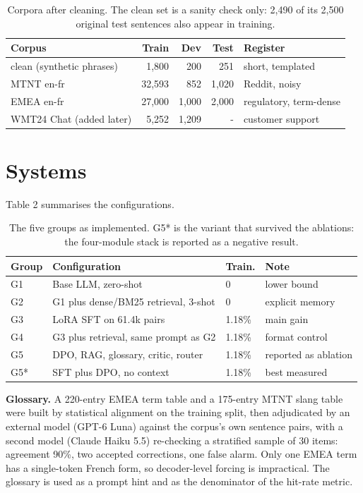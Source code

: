 \documentclass[a4paper,12pt,oneside]{article}
\begin{document}
\begin{table}[htbp]
\centering
\small

\begin{tabular}{lrrrl}
\toprule
\textbf{Corpus} & \textbf{Train} & \textbf{Dev} & \textbf{Test} & \textbf{Register} \\
\midrule
clean (synthetic phrases) & 1,800 & 200 & 251 & short, templated \\
MTNT en-fr & 32,593 & 852 & 1,020 & Reddit, noisy \\
EMEA en-fr & 27,000 & 1,000 & 2,000 & regulatory, term-dense \\
WMT24 Chat (added later) & 5,252 & 1,209 & - & customer support \\
\bottomrule
\end{tabular}
\caption{Corpora after cleaning. The clean set is a sanity check only: 2,490 of its 2,500 original test sentences also appear in training.}
\end{table}

\section{Systems}

Table 2 summarises the configurations.

\begin{table}[htbp]
\centering
\small

\begin{tabular}{l p{} l l}
\toprule
\textbf{Group} & \textbf{Configuration} & \textbf{Train.} & \textbf{Note} \\
\midrule
G1 & Base LLM, zero-shot & 0 & lower bound \\
G2 & G1 plus dense/BM25 retrieval, 3-shot & 0 & explicit memory \\
G3 & LoRA SFT on 61.4k pairs & 1.18\% & main gain \\
G4 & G3 plus retrieval, same prompt as G2 & 1.18\% & format control \\
G5 & DPO, RAG, glossary, critic, router & 1.18\% & reported as ablation \\
G5* & SFT plus DPO, no context & 1.18\% & best measured \\
\bottomrule
\end{tabular}
\caption{The five groups as implemented. G5* is the variant that survived the ablations: the four-module stack is reported as a negative result.}
\end{table}

\textbf{Glossary.} A 220-entry EMEA term table and a 175-entry MTNT slang table were built by
statistical alignment on the training split, then adjudicated by an external model
(GPT-6 Luna) against the corpus's own sentence pairs, with a second model (Claude Haiku 5.5)
re-checking a stratified sample of 30 items: agreement 90\%, two accepted corrections, one
false alarm. Only one EMEA term has a single-token French form, so decoder-level forcing is
impractical. The glossary is used as a prompt hint and as the denominator of the hit-rate
metric.
\end{document}
